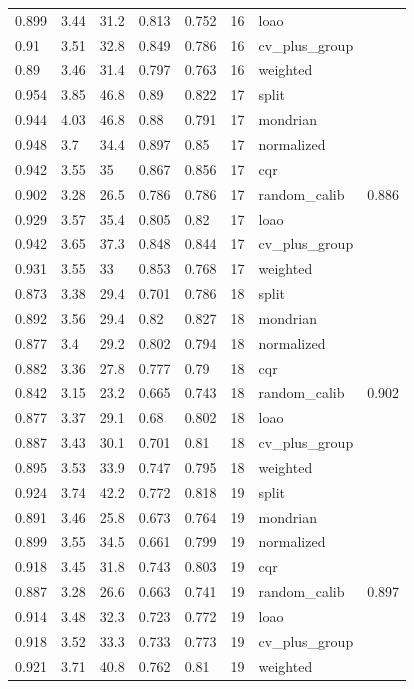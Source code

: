 \begin{tabular}{llllllll}
0.899 & 3.44 & 31.2 & 0.813 & 0.752 & 16 & loao &  \\
0.91 & 3.51 & 32.8 & 0.849 & 0.786 & 16 & cv\_plus\_group &  \\
0.89 & 3.46 & 31.4 & 0.797 & 0.763 & 16 & weighted &  \\
0.954 & 3.85 & 46.8 & 0.89 & 0.822 & 17 & split &  \\
0.944 & 4.03 & 46.8 & 0.88 & 0.791 & 17 & mondrian &  \\
0.948 & 3.7 & 34.4 & 0.897 & 0.85 & 17 & normalized &  \\
0.942 & 3.55 & 35 & 0.867 & 0.856 & 17 & cqr &  \\
0.902 & 3.28 & 26.5 & 0.786 & 0.786 & 17 & random\_calib & 0.886 \\
0.929 & 3.57 & 35.4 & 0.805 & 0.82 & 17 & loao &  \\
0.942 & 3.65 & 37.3 & 0.848 & 0.844 & 17 & cv\_plus\_group &  \\
0.931 & 3.55 & 33 & 0.853 & 0.768 & 17 & weighted &  \\
0.873 & 3.38 & 29.4 & 0.701 & 0.786 & 18 & split &  \\
0.892 & 3.56 & 29.4 & 0.82 & 0.827 & 18 & mondrian &  \\
0.877 & 3.4 & 29.2 & 0.802 & 0.794 & 18 & normalized &  \\
0.882 & 3.36 & 27.8 & 0.777 & 0.79 & 18 & cqr &  \\
0.842 & 3.15 & 23.2 & 0.665 & 0.743 & 18 & random\_calib & 0.902 \\
0.877 & 3.37 & 29.1 & 0.68 & 0.802 & 18 & loao &  \\
0.887 & 3.43 & 30.1 & 0.701 & 0.81 & 18 & cv\_plus\_group &  \\
0.895 & 3.53 & 33.9 & 0.747 & 0.795 & 18 & weighted &  \\
0.924 & 3.74 & 42.2 & 0.772 & 0.818 & 19 & split &  \\
0.891 & 3.46 & 25.8 & 0.673 & 0.764 & 19 & mondrian &  \\
0.899 & 3.55 & 34.5 & 0.661 & 0.799 & 19 & normalized &  \\
0.918 & 3.45 & 31.8 & 0.743 & 0.803 & 19 & cqr &  \\
0.887 & 3.28 & 26.6 & 0.663 & 0.741 & 19 & random\_calib & 0.897 \\
0.914 & 3.48 & 32.3 & 0.723 & 0.772 & 19 & loao &  \\
0.918 & 3.52 & 33.3 & 0.733 & 0.773 & 19 & cv\_plus\_group &  \\
0.921 & 3.71 & 40.8 & 0.762 & 0.81 & 19 & weighted &  \\
\bottomrule
\end{tabular}